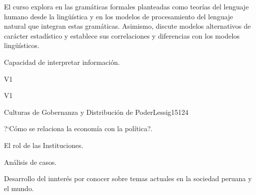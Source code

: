 \begin{syllabus}


\begin{justification}
El curso explora en las gramáticas formales planteadas como teorías del lenguaje humano desde la lingüística y en los modelos de procesamiento del lenguaje natural que integran estas gramáticas. Asimismo, discute modelos alternativos de carácter estadístico y establece sus correlaciones y diferencias con los modelos lingüísticos.
\end{justification}

\begin{goals}
\item Capacidad de interpretar información.
\end{goals}

\begin{outcomes}{V1}
    \item {}
    \item {}
    \item {}
    
\end{outcomes}

\begin{competences}{V1}
    \item {}
    \item {}
    \item {}
    \item {}
\end{competences}

\begin{unit}{Culturas de Gobernanza y Distribución de Poder}{}{Lessig15}{12}{4}
   \begin{topics}
      \item ?`Cómo se relaciona la economía con la política?.
      \item El rol de las Instituciones.
      \item Análisis de casos.
   \end{topics}
   \begin{learningoutcomes}
      \item Desarrollo del innterés por conocer sobre temas actuales en la sociedad peruana y el mundo.
   \end{learningoutcomes}
\end{unit}

\begin{coursebibliography}
\end{coursebibliography}

\end{syllabus}

